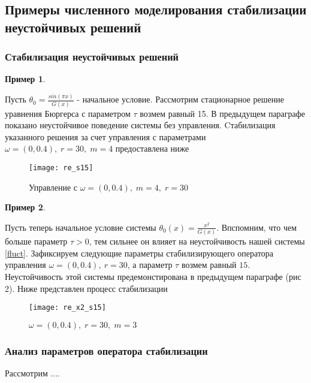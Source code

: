 \subsection{Примеры численного моделирования стабилизации неустойчивых решений}
\vspace{1em}

\subsubsection{Стабилизация неустойчивых решений}

\newtheorem{exmp_stbur}{Пример}

\begin{exmp_stbur}
\end{exmp_stbur}

Пусть $\theta_0 = \frac{sin(\pi x)}{G(x)}$ - начальное условие. Рассмотрим
стационарное решение уравнения Бюргерса с параметром $\tau$ возмем равный 15. 
В предыдущем параграфе показано неустойчивое поведение системы без управления. 
Cтабилизация указанного решения за счет управления с параметрами 
$\omega = (0, 0.4), \; r = 30, \; m = 4$ предоставлена ниже


\begin{figure}[H]
  \centering
  \texttt{[image: re\_s15]}
  \caption{Управление с $\omega = (0, 0.4), \; m = 4, \; r = 30$}
  \label{fig:test2}
\end{figure}


\begin{exmp_stbur}
\end{exmp_stbur}
Пусть теперь начальное условие системы $\theta_0(x) = \frac{x^2}{G(x)}$.
Впспомним, что чем больше параметр $\tau > 0$, тем сильнее он влияет на
неустойчивость нашей системы \eqref{fluct}. Зафиксируем следующие параметры
стабилизирующего оператора управления $\omega = (0, 0.4), \ r = 30$, а параметр 
$\tau$  возмем равный $15$. Неустойчивость этой системы предемонстирована в
предыдущем параграфе (рис 2). Ниже представлен процесс стабилизации

\begin{figure}[H]
 \centering
  \texttt{[image: re\_x2\_s15]}
  \caption{$\omega = (0, 0.4), \; r = 30, \; m = 3$}
  \label{fig:test2}
\end{figure}

\subsubsection{Анализ параметров оператора стабилизации}

Рассмотрим ....

